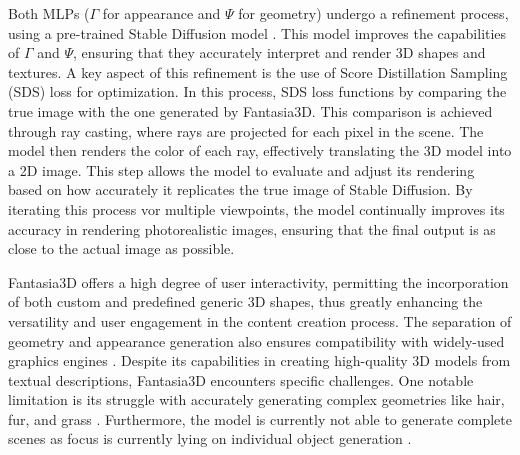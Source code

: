 Both MLPs (\(\Gamma\) for appearance and \(\Psi\) for geometry) undergo a refinement process, using a pre-trained Stable Diffusion model \citep{rombachStableDiffusion}. This model improves the capabilities of \(\Gamma\) and \(\Psi\), ensuring that they accurately interpret and render 3D shapes and textures. A key aspect of this refinement is the use of Score Distillation Sampling (SDS) loss \citep{mildenhallNERF} for optimization. In this process, SDS loss functions by comparing the true image with the one generated by Fantasia3D. This comparison is achieved through ray casting, where rays are projected for each pixel in the scene. The model then renders the color of each ray, effectively translating the 3D model into a 2D image. This step allows the model to evaluate and adjust its rendering based on how accurately it replicates the true image of Stable Diffusion. By iterating this process vor multiple viewpoints, the model continually improves its accuracy in rendering photorealistic images, ensuring that the final output is as close to the actual image as possible.

Fantasia3D offers a high degree of user interactivity, permitting the incorporation of both custom and predefined generic 3D shapes, thus greatly enhancing the versatility and user engagement in the content creation process. The separation of geometry and appearance generation also ensures compatibility with widely-used graphics engines \citep{chen2023fantasia3d}. Despite its capabilities in creating high-quality 3D models from textual descriptions, Fantasia3D encounters specific challenges. One notable limitation is its struggle with accurately generating complex geometries like hair, fur, and grass \citep{chen2023fantasia3d}. Furthermore, the model is currently not able to generate complete scenes as focus is currently lying on individual object generation \citep{chen2023fantasia3d}.